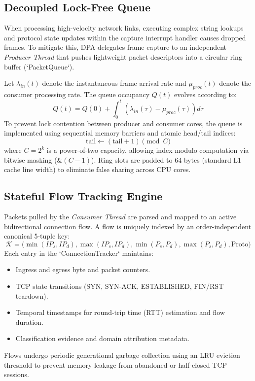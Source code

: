 \documentclass[conference]{IEEEtran}
\begin{document}
\subsection{Decoupled Lock-Free Queue}
When processing high-velocity network links, executing complex string lookups and protocol state updates within the capture interrupt handler causes dropped frames. To mitigate this, DPA delegates frame capture to an independent \textit{Producer Thread} that pushes lightweight packet descriptors into a circular ring buffer (`PacketQueue`).

Let $\lambda_{in}(t)$ denote the instantaneous frame arrival rate and $\mu_{proc}(t)$ denote the consumer processing rate. The queue occupancy $Q(t)$ evolves according to:
\begin{equation}
Q(t) = Q(0) + \int_{0}^{t} \left( \lambda_{in}(\tau) - \mu_{proc}(\tau) \right) d\tau
\end{equation}
To prevent lock contention between producer and consumer cores, the queue is implemented using sequential memory barriers and atomic head/tail indices:
\begin{equation}
\text{tail} \leftarrow (\text{tail} + 1) \pmod C
\end{equation}
where $C = 2^k$ is a power-of-two capacity, allowing index modulo computation via bitwise masking ($\& (C - 1)$). Ring slots are padded to $64$ bytes (standard L1 cache line width) to eliminate false sharing across CPU cores.

\subsection{Stateful Flow Tracking Engine}
Packets pulled by the \textit{Consumer Thread} are parsed and mapped to an active bidirectional connection flow. A flow is uniquely indexed by an order-independent canonical 5-tuple key:
\begin{equation}
\mathcal{K} = \big( \min(IP_s, IP_d), \max(IP_s, IP_d), \min(P_s, P_d), \max(P_s, P_d), \text{Proto} \big)
\end{equation}
Each entry in the `ConnectionTracker` maintains:
\begin{itemize}
    \item Ingress and egress byte and packet counters.
    \item TCP state transitions (SYN, SYN-ACK, ESTABLISHED, FIN/RST teardown).
    \item Temporal timestamps for round-trip time (RTT) estimation and flow duration.
    \item Classification evidence and domain attribution metadata.
\end{itemize}
Flows undergo periodic generational garbage collection using an LRU eviction threshold to prevent memory leakage from abandoned or half-closed TCP sessions.
\end{document}
